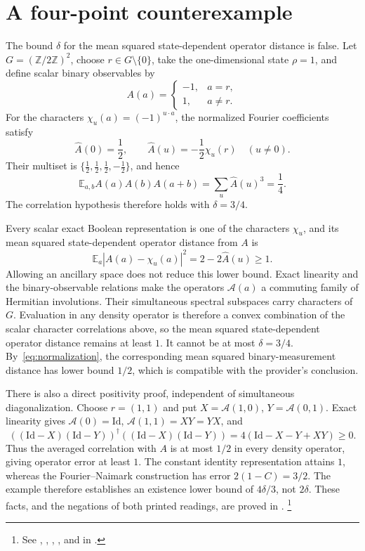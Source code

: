 \documentclass[11pt]{article}
\newcommand{\Id}{\mathrm{Id}}
\begin{document}
\section{A four-point counterexample}

The bound $\delta$ for the mean squared state-dependent operator distance is
false.  Let $G=(\mathbb Z/2\mathbb Z)^2$, choose $r\in G\setminus\{0\}$, take
the one-dimensional state $\rho=1$, and define scalar binary observables by
\[
  A(a)=\begin{cases}
    -1,&a=r,\\
     1,&a\neq r.
  \end{cases}
\]
For the characters $\chi_u(a)=(-1)^{u\cdot a}$, the normalized Fourier
coefficients satisfy
\[
  \widehat A(0)=\frac12,
  \qquad
  \widehat A(u)=-\frac12\chi_u(r)\quad(u\neq0).
\]
Their multiset is
$\{\frac12,\frac12,\frac12,-\frac12\}$, and hence
\[
  \mathbb E_{a,b}A(a)A(b)A(a+b)
    =\sum_u\widehat A(u)^3=\frac14.
\]
The correlation hypothesis therefore holds with $\delta=3/4$.

Every scalar exact Boolean representation is one of the characters $\chi_u$,
and its mean squared state-dependent operator distance from $A$ is
\[
  \mathbb E_a |A(a)-\chi_u(a)|^2
    =2-2\widehat A(u)\geq1.
\]
Allowing an ancillary space does not reduce this lower bound.  Exact linearity
and the binary-observable relations make the operators $\mathcal A(a)$ a
commuting family of Hermitian involutions.  Their simultaneous spectral
subspaces carry characters of $G$.  Evaluation in any density operator is
therefore a convex combination of the scalar character correlations above, so
the mean squared state-dependent operator distance remains at least $1$.  It
cannot be at most $\delta=3/4$.  By~\eqref{eq:normalization}, the corresponding
mean squared binary-measurement distance has lower bound $1/2$, which is
compatible with the provider's conclusion.

There is also a direct positivity proof, independent of simultaneous
diagonalization. Choose $r=(1,1)$ and put $X=\mathcal A(1,0)$,
$Y=\mathcal A(0,1)$. Exact linearity gives $\mathcal A(0)=\Id$,
$\mathcal A(1,1)=XY=YX$, and
\[
 ((\Id-X)(\Id-Y))^\dagger((\Id-X)(\Id-Y))
   =4(\Id-X-Y+XY)\geq0.
\]
Thus the averaged correlation with $A$ is at most $1/2$ in every density
operator, giving operator error at least $1$. The constant identity
representation attains $1$, whereas the Fourier--Naimark construction has
error $2(1-C)=3/2$. The example therefore establishes an existence lower
bound of $4\delta/3$, not $2\delta$. These facts, and the negations of both
printed readings, are proved in \Lean{}.%
\footnote{See ,
,
,
, and
 in
.}
\end{document}
